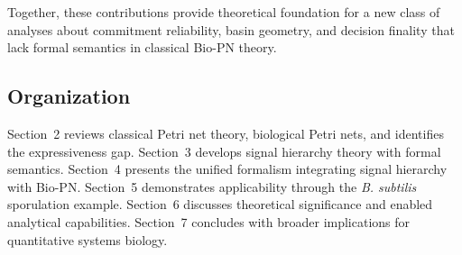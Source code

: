 \noindent Together, these contributions provide theoretical foundation for a new class of analyses about commitment reliability, basin geometry, and decision finality that lack formal semantics in classical Bio-PN theory.

\subsection{Organization}

Section~2 reviews classical Petri net theory, biological Petri nets, and identifies the expressiveness gap. Section~3 develops signal hierarchy theory with formal semantics. Section~4 presents the unified formalism integrating signal hierarchy with Bio-PN. Section~5 demonstrates applicability through the \textit{B. subtilis} sporulation example. Section~6 discusses theoretical significance and enabled analytical capabilities. Section~7 concludes with broader implications for quantitative systems biology.
